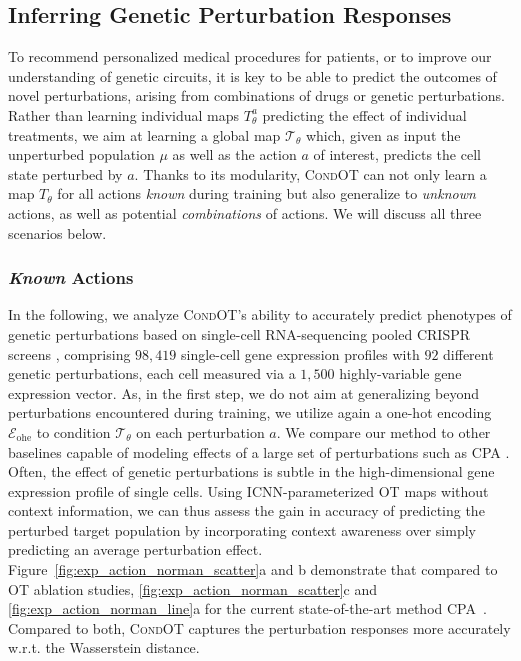 \subsection{Inferring Genetic Perturbation Responses}
\label{sec:eval_action}

 To recommend personalized medical procedures for patients, or to improve our understanding of genetic circuits, it is key to be able to predict the outcomes of novel perturbations, arising from combinations of drugs or genetic perturbations. 
Rather than learning individual maps $T_\theta^a$ predicting the effect of individual treatments, we aim at learning a global map  $\mathcal{T}_\theta$ which, given as input the unperturbed population $\mu$ as well as the action $a$ of interest, predicts the cell state perturbed by $a$.
Thanks to its modularity, \textsc{CondOT} can not only learn a map $T_\theta$ for all actions \emph{known} during training but also generalize to \emph{unknown} actions, as well as potential \emph{combinations} of actions. We will discuss all three scenarios below.

\subsubsection{\textit{Known} Actions}
\label{sec:eval_action_known}

 In the following, we analyze \textsc{CondOT}'s ability to accurately predict phenotypes of genetic perturbations based on single-cell RNA-sequencing pooled \acrfull{CRISPR} screens \citep{norman2019exploring, dixit2016perturb}, comprising $98,419$ single-cell gene expression profiles with $92$ different genetic perturbations, each cell measured via a $1,500$ highly-variable gene expression vector.
As, in the first step, we do not aim at generalizing beyond perturbations encountered during training, we utilize again a one-hot encoding $\mathcal{E}_\text{ohe}$ to condition $\mathcal{T}_\theta$ on each perturbation $a$.
We compare our method to other baselines capable of modeling effects of a large set of perturbations such as \textsc{CPA} \citep{lotfollahi2021compositional}.
Often, the effect of genetic perturbations is subtle in the high-dimensional gene expression profile of single cells. Using ICNN-parameterized OT maps without context information, we can thus assess the gain in accuracy of predicting the perturbed target population by incorporating context awareness over simply predicting an average perturbation effect. 
Figure~\ref{fig:exp_action_norman_scatter}a and b demonstrate that compared to OT ablation studies, \cref{fig:exp_action_norman_scatter}c and \cref{fig:exp_action_norman_line}a for the current state-of-the-art method \textsc{CPA}~\citep{lotfollahi2021compositional}. Compared to both, \textsc{CondOT} captures the perturbation responses more accurately w.r.t. the Wasserstein distance.

